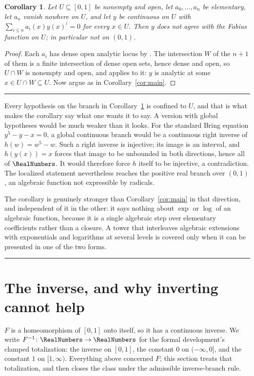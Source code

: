 \documentclass[11pt,oneside]{article}
\newtheorem{corollary}[theorem]{Corollary}
\theoremstyle{definition}
\theoremstyle{remark}
\newenvironment{boxedremark}{%
  \par\smallskip\noindent\begin{center}\begin{minipage}{0.94\textwidth}%
  \color{black}\hrule\vspace{0.6em}\small
}{%
  \vspace{0.6em}\hrule\end{minipage}\end{center}\smallskip
}
\begin{document}
\begin{corollary}\label{cor:algebraic}
Let $U\subseteq[0,1]$ be nonempty and open, let $a_0,\dots,a_n$ be elementary,
let $a_n$ vanish nowhere \emph{on $U$}, and let $y$ be continuous \emph{on
$U$} with $\sum_{i\le n}a_i(x)y(x)^i=0$ for every $x\in U$.  Then $y$ does not
agree with the Fabius function on $U$; in particular not on $(0,1)$.
\end{corollary}

\begin{proof}
Each $a_i$ has dense open analytic locus by .  The
intersection $W$ of the $n+1$ of them is a finite intersection of dense open
sets, hence dense and open, so $U\cap W$ is nonempty and open, and
 applies to it: $y$ is analytic at some $x\in U\cap
W\subseteq U$.  Now argue as in Corollary~\ref{cor:main}.
\end{proof}

\begin{boxedremark}
Every hypothesis on the branch in Corollary~\ref{cor:algebraic} is confined to
$U$, and that is what makes the corollary say what one wants it to say.  A
version with global hypotheses would be much weaker than it looks.  For the
standard Bring equation $y^5-y-x=0$, a global continuous branch would be a
continuous right inverse of $h(w)=w^5-w$.  Such a right inverse is injective;
its image is an interval, and $h(y(x))=x$ forces that image to be unbounded in
both directions, hence all of $\RealNumbers$.  It would therefore force $h$ itself to be
injective, a contradiction.  The localized statement nevertheless reaches
the positive real branch over $(0,1)$, an algebraic function not expressible by
radicals.

The corollary is genuinely stronger than Corollary~\ref{cor:main} in that
direction, and independent of it in the other: it says nothing about $\exp$ or
$\log$ of an algebraic function, because it is a single algebraic step over
elementary coefficients rather than a closure.  A tower that interleaves
algebraic extensions with exponentials and logarithms at several levels is
covered only when it can be presented in one of the two forms.
\end{boxedremark}

\section{The inverse, and why inverting cannot help}\label{sec:inverse}

$F$ is a homeomorphism of $[0,1]$ onto itself, so it has a continuous inverse.
We write $F^{-1}\colon\RealNumbers\to\RealNumbers$ for the formal development's clamped
totalization: the inverse on $[0,1]$, the constant $0$ on $(-\infty,0]$, and
the constant $1$ on $[1,\infty)$.  Everything above concerned $F$; this
section treats that totalization, and then closes the class under the
admissible inverse-branch rule.
\end{document}
